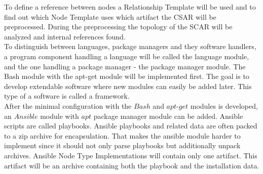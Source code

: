 To define a reference between nodes a Relationship Template will be used and to find out which Node Template uses which artifact the CSAR will be preprocessed.
During the preprocessing the topology of the SCAR will be analyzed and internal references found.\\
To distinguish between languages, package managers and they software handlers, a program component handling a language will be called the language module, and the one handling a package manager - the package manager module.
The Bash module with the apt-get module will be implemented first. 
The goal is to develop extendable software where new modules can easily be added later.
This type of a software is called a framework.\\
After the minimal configuration with the $Bash$ and $apt$-$get$ modules is developed, an $Ansible$ module with $apt$ package manager module can be added. 
Ansible scripts are called playbooks. 
Ansible playbooks and related data are often packed to a zip archive for encapsulation.
That makes the ansible module harder to implement since it should not only parse playbooks but additionally unpack archives. Ansible Node Type Implementations will contain only one artifact.
This artifact will be an archive containing both the playbook and the installation data.
